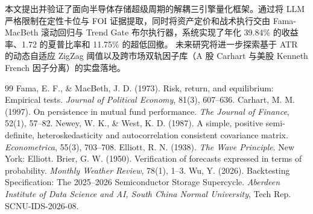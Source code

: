 \documentclass[11pt,a4paper]{article}
\begin{document}
本文提出并验证了面向半导体存储超级周期的解耦三引擎量化框架。通过将 LLM 严格限制在定性卡位与 FOI 证据提取，同时将资产定价和战术执行交由 Fama-MacBeth 滚动回归与 Trend Gate 布尔执行器，系统实现了年化 39.84\% 的收益率、1.72 的夏普比率和 11.75\% 的超低回撤。
未来研究将进一步探索基于 ATR 的动态自适应 ZigZag 阈值以及跨市场双轨因子库（A 股 Carhart 与美股 Kenneth French 因子分离）的实盘落地。

\begin{thebibliography}{99}
 Fama, E. F., \& MacBeth, J. D. (1973). Risk, return, and equilibrium: Empirical tests. \emph{Journal of Political Economy}, 81(3), 607--636.
 Carhart, M. M. (1997). On persistence in mutual fund performance. \emph{The Journal of Finance}, 52(1), 57--82.
 Newey, W. K., \& West, K. D. (1987). A simple, positive semi-definite, heteroskedasticity and autocorrelation consistent covariance matrix. \emph{Econometrica}, 55(3), 703--708.
 Elliott, R. N. (1938). \emph{The Wave Principle}. New York: Elliott.
 Brier, G. W. (1950). Verification of forecasts expressed in terms of probability. \emph{Monthly Weather Review}, 78(1), 1--3.
 Wu, Y. (2026). Backtesting Specification: The 2025--2026 Semiconductor Storage Supercycle. \emph{Aberdeen Institute of Data Science and AI, South China Normal University}, Tech Rep. SCNU-IDS-2026-08.
\end{thebibliography}
\end{document}
